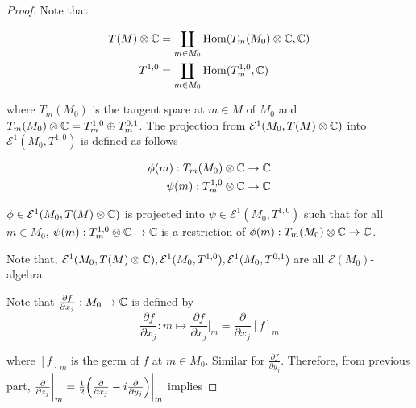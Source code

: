 \documentclass{article}
\begin{document}
\begin{proof}

Note that

\begin{align*}
    T(M) \otimes \mathbb{C} &= \coprod_{m \in M_0} \operatorname{Hom}(T_m(M_0) \otimes \mathbb{C}, \mathbb{C}) \\
    T^{1, 0} &= \coprod_{m \in M_0} \operatorname{Hom}(T^{1, 0}_m, \mathbb{C})
\end{align*}

where $T_m(M_0)$ is the tangent space at $m \in M$ of $M_0$ and $T_m(M_0) \otimes \mathbb{C} = T^{1, 0}_m \oplus T^{0, 1}_m$. The projection from $\mathcal{E}^1(M_0, T(M) \otimes \mathbb{C})$ into $\mathcal{E}^1(M_0, T^{1, 0})$ is defined as follows
\begin{center}
\end{center}

\begin{align*}
    \phi(m) : T_m(M_0) \otimes \mathbb{C} \to \mathbb{C} \\
    \psi(m) : T^{1, 0}_m \otimes \mathbb{C} \to \mathbb{C}
\end{align*}

$\phi \in \mathcal{E}^1(M_0, T(M) \otimes \mathbb{C})$ is projected into $\psi \in \mathcal{E}^1(M_0, T^{1, 0})$ such that for all $m \in M_0$, $\psi(m): T^{1, 0}_m \otimes \mathbb{C} \to \mathbb{C}$ is a restriction of $\phi(m): T_m(M_0) \otimes \mathbb{C} \to \mathbb{C}$.


Note that, $\mathcal{E}^1(M_0, T(M) \otimes \mathbb{C}), \mathcal{E}^1(M_0, T^{1, 0}), \mathcal{E}^1(M_0, T^{0, 1})$ are all $\mathcal{E}(M_0)$-algebra.

Note that $\frac{\partial f}{\partial x_j}: M_0 \to \mathbb{C}$ is defined by
$$
    \frac{\partial f}{\partial x_j}: m \mapsto \frac{\partial f}{\partial x_j}\bigg\vert_m = \frac{\partial}{\partial x_j} [f]_m
$$

where $[f]_m$ is the germ of $f$ at $m \in M_0$. Similar for $\frac{\partial f}{\partial y_j}$. Therefore, from previous part, $\frac{\partial}{\partial z_j}\bigg\vert_m = \frac{1}{2} \tuple*{\frac{\partial}{\partial x_j}  - i\frac{\partial}{\partial y_j} }\bigg\vert_m$ implies


\end{proof}
\end{document}
